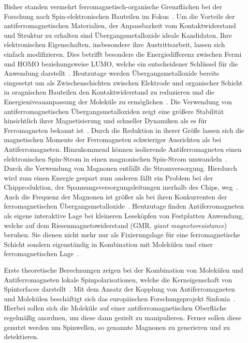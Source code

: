     Bisher standen vermehrt ferromagnetisch-organische Grenzflächen bei der Forschung nach Spin-elektronischen Bauteilen im Fokus~\cite{ma-DJ}.
    Um die Vorteile der antiferromagnetischen Materialien, der Anpassbarkeit vom Kontaktwiderstand und Struktur zu erhalten sind Übergangsmetalloxide ideale Kandidaten.
    Ihre elektronischen Eigenschaften, insbesondere ihre Austrittsarbeit, lassen sich einfach modifizieren.
    Dies betrifft besonders die Energiedifferenz zwischen Fermi und HOMO beziehungsweise LUMO, welche ein entscheidener Schlüssel für die Anwendung darstellt~\cite{5A_4}.
    Heutzutage werden Übergangsmetalloxide bereits eingesetzt um als Zwischenschichten zwischen Elektrode und organischer Schicht in oragnischen Bauteilen den Kontaktwiderstand zu reduzieren und die Energieniveauanpassung der Moleküle zu ermöglichen~\cite{IF_11}.
    Die Verwendung von antiferromagnetischen Übergangsmetalloxiden zeigt eine größere Stabilität hinsichtlich ihrer Magnetisierung und schneller Dynamiken als es für Ferromagneten bekannt ist~\cite{AFM_1}.
    Durch die Reduktion in iherer Größe lassen sich die magnetischen Momente der Ferromagneten schwieriger Ausrichten als bei Antiferromagneten.
    Hinzukommend können isolierende Antiferromagneten einen elektronischen Spin-Strom in einen magnonischen Spin-Strom umwandeln~\cite{AFM_1}.
    Durch die Verwendung von Magnonen entfällt die Stromversorgung.
    Hierdurch wird zum einen Energie gespart zum anderen fällt ein Problem bei der Chipproduktion, der Spannungsversorgungsleitungen inerhalb des Chips, weg~\cite{AFM_3}.
    Auch die Frequenz der Magnonen ist größer als bei ihren Konkurrenten der ferromagnetischen Übergangsmetalloxide~\cite{AFM_5}.
    Heutzutage finden Antiferromagneten als eigene interaktive Lage bei kleineren Leseköpfen von Festplatten Anwendung, welche auf dem Riesenmagnetowiderstand (GMR, \textit{giant magnetoresistance}) beruhen.
    Sie dienen nicht mehr nur als Fixierungslage für eine ferromagnetische Schicht sondern eigenständig in Kombination mit Molekülen und einer ferromagnetischen Lage~\cite{bagrets_single_2012}.

    Erste theoretische Berechnungen zeigen bei der Kombination von Molekülen und Antiferromagneten lokale Spinpolarisationen, welche die Kerneigenschaft von Spinterfaces darstellt~\cite{AFM_2}.
    Mit dem Ansatz der Kopplung von Antiferromagneten und Molekülen beschäftigt sich das europäischen Forschungsprojekt Sinfonia~\cite{SINFONIA}.
    Hierbei sollen sich die Moleküle auf einer antiferromagnetischen Oberfläche regelmäßig anordnen, um diese dann gezielt zu manipulieren.
    Ferner sollen diese genutzt werden um Spinwellen, so genannte Magnonen zu generieren und zu detektieren.

